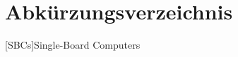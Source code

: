 
\chapter*{Abkürzungsverzeichnis}
\begin{acronym}[SBC]                %

 [SBCs]{Single-Board Computers}

\end{acronym}
